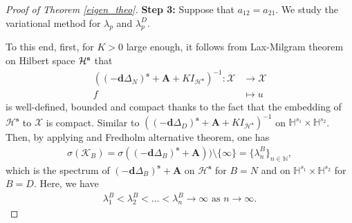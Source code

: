 \documentclass[a4paper,11pt]{amsart}
\theoremstyle{definition}
\numberwithin{equation}{section}
\theoremstyle{definition}
\begin{document}
\begin{proof}[Proof of Theorem \ref{eigen_theo}]
\textbf{Step 3:} Suppose that $a_{12}=a_{21}$. We study the variational method for $\lambda_p$ and $\lambda_p^D$.



 To this end, first, for $K>0$ large enough, it follows from Lax-Milgram theorem on Hilbert space $\mathcal{H}^{\bf s}$ that 
\begin{align*}
((-\textbf{d}\Delta_N)^{\textbf{s}} + \textbf{A}+K I_{\mathcal{H}^{\textbf{s}}})^{-1}: \mathcal{X}&\rightarrow \mathcal{X}\\
f&\mapsto u
\end{align*}
is well-defined, bounded and compact thanks to the fact that  the embedding of $\mathcal{H}^{\textbf{s}}$ to $\mathcal{X}$ is compact. Similar to $((-\textbf{d}\Delta_D)^{\textbf{s}} + \textbf{A}+K I_{\mathcal{H}^{\textbf{s}}})^{-1}$ on $\mathbb{H}^{s_1}\times\mathbb{H}^{s_2}$. Then, by applying \cite[Theorem 6.11]{brezis_functional_2011} and Fredholm alternative theorem, one has
\begin{align*}
\sigma\left(\mathcal{K}_B\right)= \sigma((-\textbf{d}\Delta_B)^{\textbf{s}}+ \textbf{A}))\setminus\{\infty\}=\{\lambda^B_{n}\}_{n\in \mathbb{N}},
\end{align*}
which is the spectrum of $(-\mathbf{d}\Delta_B)^{\mathbf{s}}+\mathbf{A}$ on $\mathcal{H}^{\mathbf{s}}$ for $B=N$ and on $\mathbb{H}^{s_1}\times\mathbb{H}^{s_2}$ for $B=D$. Here, we have 
\begin{align*}
\lambda_1^B<\lambda_2^B<...<\lambda_n^B\rightarrow \infty \text{ as }n\rightarrow \infty.
\end{align*}


\end{proof}
\end{document}
